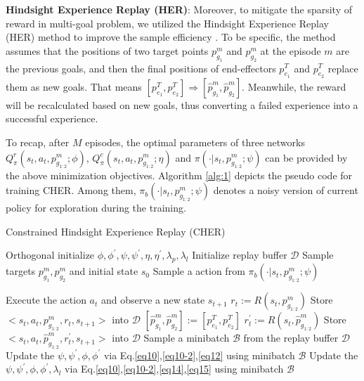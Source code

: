 \documentclass{article}
\begin{document}
\textbf{Hindsight Experience Replay (HER)}: Moreover, to mitigate the sparsity of reward in multi-goal problem, we utilized the Hindsight Experience Replay (HER) method to improve the sample efficiency \cite{andrychowicz2017hindsight}. To be specific, the method assumes that the positions of two target points $p^m_{g_1}$ and $p^m_{g_2}$ at the episode $m$ are the previous goals, and then the final positions of end-effectors $p^{T}_{e_1}$ and $p^{T}_{e_2}$ replace them as new goals. That means $[p^{T}_{e_1},p^{T}_{e_2}] \Rightarrow [\hat p^m_{g_1},\hat p^m_{g_2}]$. Meanwhile, the reward will be recalculated based on new goals, thus converting a failed experience into a successful experience. 

To recap, after $M$ episodes, the optimal parameters of three networks $Q^r_\pi(s_t,a_t,p^m_{g_{1:2}};\phi)$, $Q^c_\pi(s_t,a_t,p^m_{g_{1:2}};\eta)$ and $ \pi(\cdot|s_t,p^m_{g_{1:2}};\psi)$ can be provided by the above minimization objectives.  Algorithm \ref{alg:1} depicts the pseudo code for training CHER. Among them, $\pi_b(\cdot|s_t,p^m_{g_{1:2}};\psi)$ denotes a noisy version of current policy for exploration during the training.


\begin{algorithm}[t]
	\renewcommand{\algorithmicrequire}{\textbf{Input:}}
	\renewcommand{\algorithmicensure}{\textbf{Output:}}
	\caption{ Constrained Hindsight Experience Replay (CHER)}
	\label{alg:1}
	\begin{algorithmic}[1]
	    \STATE Orthogonal initialize $\phi,\phi^{\prime},\psi,\psi^{\prime}, \eta,\eta^{\prime},\lambda_p, \lambda_l$
	    \STATE Initialize replay buffer $\mathcal D$
	     \STATE Sample targets $p^m_{g_{1}}, p^m_{g_{2}}$ and initial state $s_0$ 
	    \STATE Sample a action from $\pi_b(\cdot|s_t,p^m_{g_{1:2}};\psi)$
	    
	    \STATE Execute the action $a_t$ and observe a new state $s_{t+1}$
	    \ENDFOR
	    \STATE $r_t:=R(s_t,p^m_{g_{1:2}})$
	    \STATE Store $<s_t,a_t,p^m_{g_{1:2}},r_t,s_{t+1}>$ into $\mathcal{D}$
	    \STATE $ [\hat p^m_{g_1},\hat p^m_{g_2}] := [p^{T}_{e_1},p^{T}_{e_2}]$
	    \STATE $r^\prime_t:=R(s_t,\hat p^m_{g_{1:2}})$
	    \STATE Store $<s_t,a_t,\hat p^m_{g_{1:2}},r^\prime_t,s_{t+1}>$ into $\mathcal{D}$
	    \ENDFOR
	    \STATE Sample a minibatch $\mathcal B$ from the replay buffer $\mathcal D$
	    \STATE Update the $\psi,\psi^{\prime},\phi,\phi^{\prime}$ via Eq.\eqref{eq10},\eqref{eq10-2},\eqref{eq12} using minibatch $\mathcal B$
	    \ENDIF
	    \STATE Update the $\psi,\psi^{\prime},\phi,\phi^{\prime},\lambda_l$ via Eq.\eqref{eq10},\eqref{eq10-2},\eqref{eq14},\eqref{eq15} using minibatch $\mathcal B$
	    \ENDIF
	    \ENDFOR
	    \ENDFOR
	\end{algorithmic}
\end{algorithm}
\end{document}

